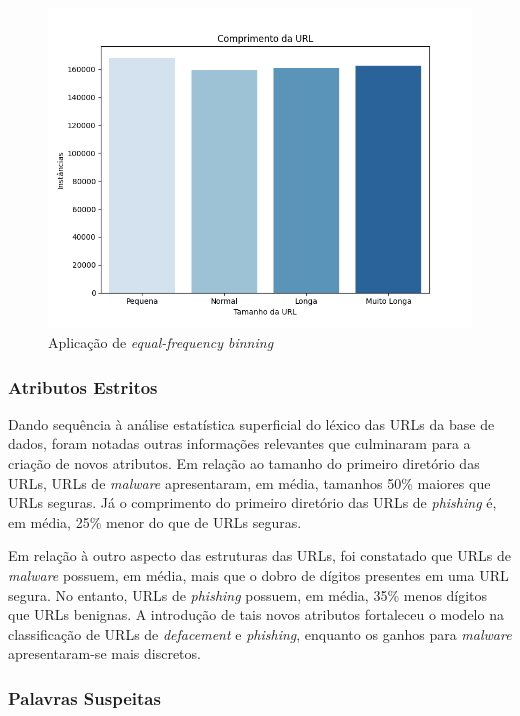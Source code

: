 \documentclass[a4paper, 12pt]{article}
\begin{document}
\begin{figure}[H]
    \centering
    \includegraphics[width=1\textwidth]{Images/Figure_3.png}
    \caption{Aplicação de \emph{equal-frequency binning}}
    \label{fig:exampleFig4}
\end{figure}

\subsubsection{Atributos Estritos}

Dando sequência à análise estatística superficial do léxico das URLs da base de dados, foram notadas outras informações relevantes que culminaram para a criação de novos atributos. Em relação ao tamanho do primeiro diretório das URLs, URLs de \emph{malware} apresentaram, em média, tamanhos 50\% maiores que URLs seguras. Já o comprimento do primeiro diretório das URLs de \emph{phishing} é, em média, 25\% menor do que de URLs seguras.

Em relação à outro aspecto das estruturas das URLs, foi constatado que URLs de \emph{malware} possuem, em média, mais que o dobro de dígitos presentes em uma URL segura. No entanto, URLs de \emph{phishing} possuem, em média, 35\% menos dígitos que URLs benignas. A introdução de tais novos atributos fortaleceu o modelo na classificação de URLs de \emph{defacement} e \emph{phishing}, enquanto os ganhos para \emph{malware} apresentaram-se mais discretos.

\subsubsection{Palavras Suspeitas}
\end{document}
